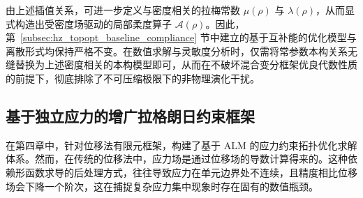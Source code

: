 由上述插值关系，可进一步定义与密度相关的拉梅常数 $\mu(\rho)$ 与 $\lambda(\rho)$，从而显式构造出受密度场驱动的局部柔度算子 $\mathcal{A}(\rho)$。因此，第~\ref{subsec:hz_topopt_baseline_compliance} 节中建立的基于互补能的优化模型与离散形式均保持严格不变。在数值求解与灵敏度分析时，仅需将常参数本构关系无缝替换为上述密度相关的本构模型即可，从而在不破坏混合变分框架优良代数性质的前提下，彻底排除了不可压缩极限下的非物理演化干扰。



\subsection{基于独立应力的增广拉格朗日约束框架}
\label{subsec:hz_topopt_stress_constrained}

在第四章中，针对位移法有限元框架，构建了基于 ALM 的应力约束拓扑优化求解体系。然而，在传统的位移法中，应力场是通过位移场的导数计算得来的。这种依赖形函数求导的后处理方式，往往导致应力在单元边界处不连续，且精度相比位移场会下降一个阶次，这在捕捉复杂应力集中现象时存在固有的数值瓶颈。

